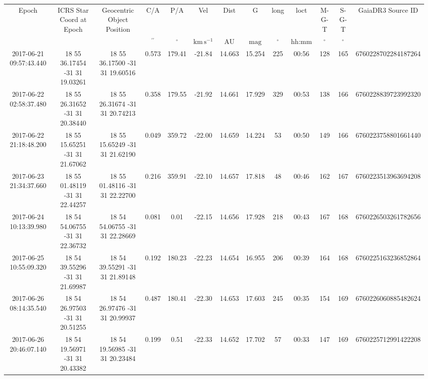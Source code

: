 \begin{table}
\begin{tabular}{ccccccccccccc}
Epoch & ICRS Star Coord at Epoch & Geocentric Object Position & C/A & P/A & Vel & Dist & G & long & loct & M-G-T & S-G-T & GaiaDR3 Source ID \\
 &  &  & $\mathrm{{}^{\prime\prime}}$ & $\mathrm{{}^{\circ}}$ & $\mathrm{km\,s^{-1}}$ & $\mathrm{AU}$ & $\mathrm{mag}$ & $\mathrm{{}^{\circ}}$ & hh:mm & $\mathrm{{}^{\circ}}$ & $\mathrm{{}^{\circ}}$ &  \\
2017-06-21 09:57:43.440 & 18 55 36.17454 -31 31 19.03261 & 18 55 36.17500 -31 31 19.60516 & 0.573 & 179.41 & -21.84 & 14.663 & 15.254 & 225 & 00:56 & 128 & 165 & 6760228702284187264 \\
2017-06-22 02:58:37.480 & 18 55 26.31652 -31 31 20.38440 & 18 55 26.31674 -31 31 20.74213 & 0.358 & 179.55 & -21.92 & 14.661 & 17.929 & 329 & 00:53 & 138 & 166 & 6760228839723992320 \\
2017-06-22 21:18:48.200 & 18 55 15.65251 -31 31 21.67062 & 18 55 15.65249 -31 31 21.62190 & 0.049 & 359.72 & -22.00 & 14.659 & 14.224 & 53 & 00:50 & 149 & 166 & 6760223758801661440 \\
2017-06-23 21:34:37.660 & 18 55 01.48119 -31 31 22.44257 & 18 55 01.48116 -31 31 22.22700 & 0.216 & 359.91 & -22.10 & 14.657 & 17.818 & 48 & 00:46 & 162 & 167 & 6760223513963694208 \\
2017-06-24 10:13:39.980 & 18 54 54.06755 -31 31 22.36732 & 18 54 54.06755 -31 31 22.28669 & 0.081 & 0.01 & -22.15 & 14.656 & 17.928 & 218 & 00:43 & 167 & 168 & 6760226503261782656 \\
2017-06-25 10:55:09.320 & 18 54 39.55296 -31 31 21.69987 & 18 54 39.55291 -31 31 21.89148 & 0.192 & 180.23 & -22.23 & 14.654 & 16.955 & 206 & 00:39 & 164 & 168 & 6760225163236852864 \\
2017-06-26 08:14:35.540 & 18 54 26.97503 -31 31 20.51255 & 18 54 26.97476 -31 31 20.99937 & 0.487 & 180.41 & -22.30 & 14.653 & 17.603 & 245 & 00:35 & 154 & 169 & 6760226060885482624 \\
2017-06-26 20:46:07.140 & 18 54 19.56971 -31 31 20.43382 & 18 54 19.56985 -31 31 20.23484 & 0.199 & 0.51 & -22.33 & 14.652 & 17.702 & 57 & 00:33 & 147 & 169 & 6760225712991422208 \\
\end{tabular}
\end{table}
